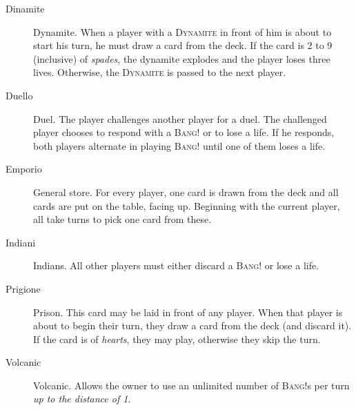 \documentclass[a4paper,10pt,reqno]{amsart}
\newcommand{\card}[1]{\textsc{#1}}
\newcommand{\col}[1]{\textit{#1}}
\begin{document}
	\begin{description}
		\item[Dinamite] Dynamite. When a player with a \card{Dynamite} in front of him is about
			to start his turn, he must draw a card from the deck. If the card is 2 to 9 (inclusive)
			of \col{spades}, the dynamite explodes and the player loses three lives. Otherwise,
			the \card{Dynamite} is passed to the next player.
		\item[Duello] Duel. The player challenges another player for a duel. The challenged player
			chooses to respond with a \card{Bang!} or to lose a life. If he responds, both players alternate
			in playing \card{Bang!} until one of them loses a life.
		\item[Emporio] General store. For every player, one card is drawn from the deck and all cards
			are put on the table, facing up. Beginning with the current player, all take turns to pick
			one card from these.
		\item[Indiani] Indians. All other players must either discard a \card{Bang!} or lose a life.
		\item[Prigione] Prison. This card may be laid in front of any player. When that player is about
			to begin their turn, they draw a card from the deck (and discard it). If the card is of
			\col{hearts}, they may play, otherwise they skip the turn.
		\item[Volcanic] Volcanic. Allows the owner to use an unlimited number of \card{Bang!}s per turn
			\col{up to the distance of 1}.
	\end{description}
	
\end{document}
